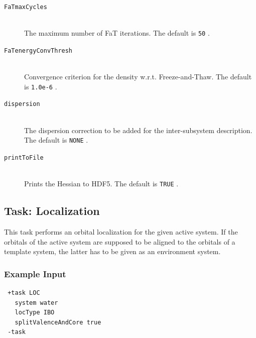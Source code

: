 \documentclass[bibliography=totocnumbered,a4paper,10pt,oneside]{scrbook}
\newcommand{\ttt}[1]{%
  \begingroup\setlength{\fboxsep}{1pt}%
  \colorbox{serenity-green!30}{\texttt{\hspace*{2pt}\vphantom{(g}#1\hspace*{2pt}}}%
  \endgroup
}
\begin{document}
\begin{description}
\item [\texttt{FaTmaxCycles}]\hfill \\
  The maximum number of FaT iterations. The default is \ttt{50}.
\item [\texttt{FaTenergyConvThresh}]\hfill \\
  Convergence criterion for the density w.r.t. Freeze-and-Thaw. The default is \ttt{1.0e-6}.
\item [\texttt{dispersion}]\hfill \\
  The dispersion correction to be added for the inter-subsystem description. The default is \ttt{NONE}.
\item [\texttt{printToFile}]\hfill \\
  Prints the Hessian to HDF5. The default is \ttt{TRUE}.
\end{description}

\subsection{Task: Localization}\label{task:localization}
This task performs an orbital localization for the given active system. If the orbitals of
the active system are supposed to be aligned to the orbitals of a template system, the latter
has to be given as an environment system.

\subsubsection{Example Input}
\begin{lstlisting}
 +task LOC
   system water
   locType IBO
   splitValenceAndCore true
 -task
\end{lstlisting}
\end{document}

